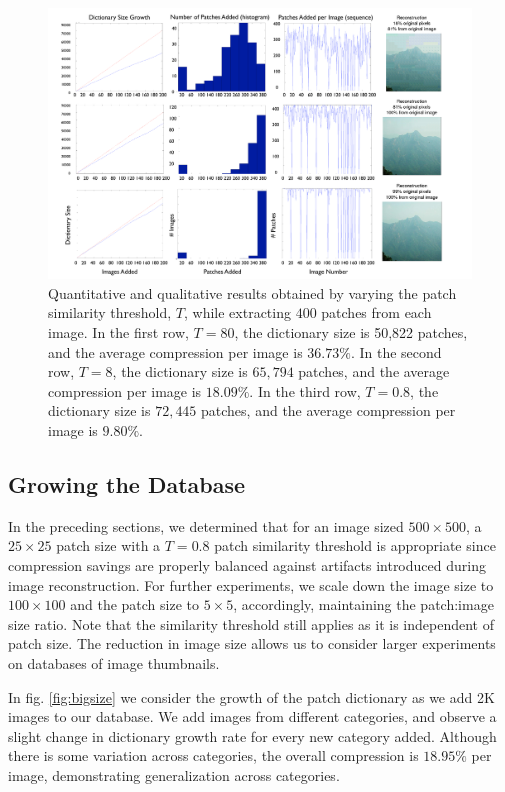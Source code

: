  \begin{figure}
\includegraphics[width=1\linewidth]{Figures/perfGraphs_25_big.pdf}
\caption{Quantitative and qualitative results obtained by varying the patch similarity threshold, $T$, while extracting $400$ patches from each image. In the first row, $T=80$, the dictionary size is 50,822 patches, and the average compression per image is $36.73\%$. In the second row, $T=8$, the dictionary size is $65,794$ patches, and the average compression per image is $18.09\%$. In the third row, $T=0.8$, the dictionary size is $72,445$ patches, and the average compression per image is $9.80\%$.}
\label{fig:perfGraphs}
\end{figure}

\subsection{Growing the Database}
\label{sec:growing_db}

In the preceding sections, we determined that for an image sized $500\times 500$, a $25\times 25$ patch size with a $T=0.8$ patch similarity threshold is appropriate since compression savings are properly balanced against artifacts introduced during image reconstruction. For further experiments, we scale down the image size to $100\times 100$ and the patch size to $5\times 5$, accordingly, maintaining the patch:image size ratio. Note that the similarity threshold still applies as it is independent of patch size. The reduction in image size allows us to consider larger experiments on databases of image thumbnails. 

In fig. \ref{fig:bigsize} we consider the growth of the patch dictionary as we add 2K images to our database. We add images from different categories, and observe a slight change in dictionary growth rate for every new category added. Although there is some variation across categories, the overall compression is $18.95\%$ per image, demonstrating generalization across categories.

